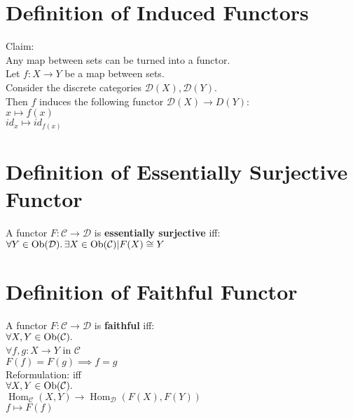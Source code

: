 \documentclass[a4paper, twoside, english, 11pt]{book}
\DeclareMathOperator{\Hom}{Hom}
\DeclareMathOperator{\Ob}{Ob}
\newcommand{\C}{\mathcal C}
\newcommand{\D}{\mathcal D}
\begin{document}
\section{Definition of Induced Functors}

Claim: \\
Any map between sets can be turned into a functor. \\

\noindent
Let $f : X \rightarrow Y$ be a map between sets. \\

\noindent
Consider the discrete categories $\D(X), \D(Y)$. \\

\noindent
Then $f$ induces the following functor $\D(X) \rightarrow D(Y)$: \\
\indent
$x \mapsto f(x)$ \\
\indent
$id_x \mapsto id_{f(x)}$



\section{Definition of Essentially Surjective Functor}

A functor $F : \C \rightarrow \D$ is \textbf{essentially surjective} iff: \\

$\forall Y \in \Ob(\D) \ldotp \exists X \in \Ob(\C) | F(X) \cong Y$



\section{Definition of Faithful Functor}

A functor $F : \C \rightarrow \D$ is \textbf{faithful} iff: \\

$\forall X, Y \in \Ob(\C) \ldotp$ \\
\indent
$\forall f, g : X \rightarrow Y$ in $\C$ \\
\indent
$F(f) = F(g) \implies f = g$ \\

\noindent
Reformulation: iff \\

$\forall X, Y \in \Ob(\C) \ldotp$ \\
\indent
$\Hom_\C(X, Y) \rightarrow \Hom_\D(F(X), F(Y))$ \\
\indent
$f \mapsto F(f)$ \\
\end{document}
